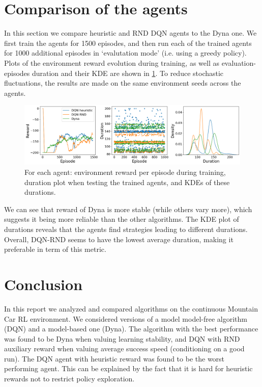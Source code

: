 \documentclass[a4paper, 12pt,oneside]{article}
\begin{document}
        \section{Comparison of the agents}
        In this section we compare heuristic and RND DQN agents to the Dyna one. We first train the agents for 1500 episodes, and then run each of the trained agents for 1000 additional episodes in `evalutation mode' (i.e. using a greedy policy). Plots of the environment reward evolution during training, as well as evaluation-episodes duration and their KDE are shown in \ref{fig:agent-performance-comparison}. To reduce stochastic fluctuations, the results are made on the same environment seeds across the agents.
        \begin{figure}[h!]
            \centering
            \vspace{0em}
            \includegraphics[width=1\textwidth]{../code/comparison}
            \caption{For each agent: environment reward per episode during training, duration plot when testing the trained agents, and KDEs of these durations.}
            \label{fig:agent-performance-comparison}
        \end{figure}
        
        We can see that reward of Dyna is more stable (while others vary more), which suggests it being more reliable than the other algorithms. The KDE plot of durations reveals that the agents find strategies leading to different durations. Overall, DQN-RND seems to have the lowest average duration, making it preferable in term of this metric.  
        \section{Conclusion}
        In this report we analyzed and compared algorithms on the continuous Mountain Car RL environment. We considered versions of a model model-free algorithm (DQN) and a model-based one (Dyna). The algorithm with the best performance was found to be Dyna when valuing learning stability, and DQN with RND auxiliary reward when valuing average success speed (conditioning on a good run). The DQN agent with heuristic reward was found to be the worst performing agent. This can be explained by the fact that it is hard for heuristic rewards not to restrict policy exploration.
\end{document}
